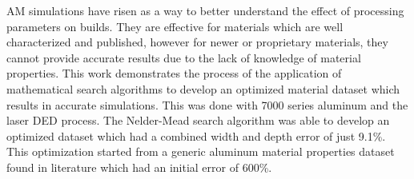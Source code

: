 \label{abstract}

\Acf{AM} simulations have risen as a way to better understand the effect of processing parameters on builds.  They are effective for materials which are well characterized and published, however for newer or proprietary materials, they cannot provide accurate results due to the lack of knowledge of material properties.  This work demonstrates the process of the application of mathematical search algorithms to develop an optimized material dataset which results in accurate simulations.  This was done with 7000 series aluminum and the laser \ac{DED} process.  The Nelder-Mead search algorithm was able to develop an optimized dataset which had a combined width and depth error of just 9.1\%.  This optimization started from a generic aluminum material properties dataset found in literature which had an initial error of 600\%.